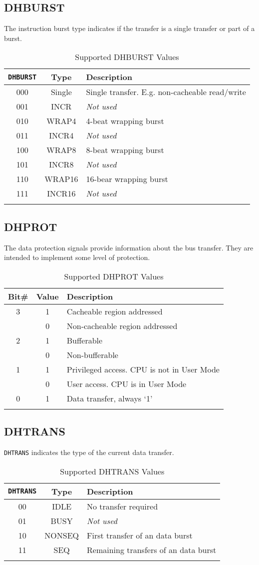 \subsection{DHBURST}\label{dhburst}

The instruction burst type indicates if the transfer is a single
transfer or part of a burst.

\begin{longtable}[]{@{}ccl@{}}
\toprule
\texttt{DHBURST} & Type & Description\tabularnewline
\midrule
\endhead
000 & Single & Single transfer. E.g. non-cacheable
read/write\tabularnewline
001 & INCR   & \emph{Not used}\tabularnewline
010 & WRAP4  & 4-beat wrapping burst\tabularnewline
011 & INCR4  & \emph{Not used}\tabularnewline
100 & WRAP8  & 8-beat wrapping burst\tabularnewline
101 & INCR8  & \emph{Not used}\tabularnewline
110 & WRAP16 & 16-bear wrapping burst\tabularnewline
111 & INCR16 & \emph{Not used}\tabularnewline
\bottomrule
\caption{Supported DHBURST Values}
\label{tab:dhburst-values}
\end{longtable}


\subsection{DHPROT}\label{dhprot}

The data protection signals provide information about the bus transfer.
They are intended to implement some level of protection.

\begin{longtable}[]{@{}ccl@{}}
\toprule
Bit\# & Value & Description\tabularnewline
\midrule
\endhead
3 & 1 & Cacheable region addressed\tabularnewline
  & 0 & Non-cacheable region addressed\tabularnewline
2 & 1 & Bufferable\tabularnewline
  & 0 & Non-bufferable\tabularnewline
1 & 1 & Privileged access. CPU is not in User Mode\tabularnewline
  & 0 & User access. CPU is in User Mode\tabularnewline
0 & 1 & Data transfer, always `1'\tabularnewline
\bottomrule
\caption{Supported DHPROT Values}
\label{tab:dhprot-values}
\end{longtable}

\subsection{DHTRANS}\label{dhtrans}

\texttt{DHTRANS} indicates the type of the current data transfer.

\begin{longtable}[]{@{}ccl@{}}
\toprule
\texttt{DHTRANS} & Type & Description\tabularnewline
\midrule
\endhead
00 & IDLE   & No transfer required\tabularnewline
01 & BUSY   & \emph{Not used}\tabularnewline
10 & NONSEQ & First transfer of an data burst\tabularnewline
11 & SEQ    & Remaining transfers of an data burst\tabularnewline
\bottomrule
\caption{Supported DHTRANS Values}
\label{tab:dhtrans-values}
\end{longtable}

